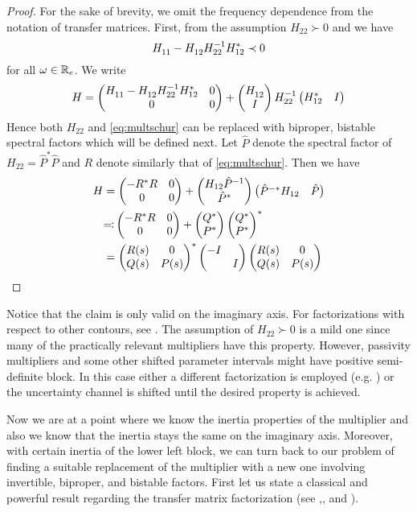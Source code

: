 \begin{proof} For the sake of brevity, we omit the frequency dependence from the notation of transfer matrices. First, 
from the assumption $H_{22}\succ 0$ and  we have 
\begin{equation}
H^{\vphantom{-1}}_{11} -H^{\vphantom{-1}}_{12}H_{22}^{-1}H_{12}^* \prec 0
\label{eq:multschur}
\end{equation}
for all $\omega\in\mathbb{R}_e$. We write
\[
H = \begin{pmatrix}H^{\vphantom{-1}}_{11} -H^{\vphantom{-1}}_{12}H_{22}^{-1}H_{12}^*&0\\ 0&0\end{pmatrix} + 
\begin{pmatrix}H^{\vphantom{-1}}_{12}\\ I\end{pmatrix}H_{22}^{-1}\begin{pmatrix}H_{12}^* &I\end{pmatrix}
\]
Hence both $H_{22}$ and \eqref{eq:multschur} can be replaced with biproper, bistable spectral factors 
which will be defined next. Let $\hat{P}$ denote the spectral factor of $H_{22} = \hat{P}^*\hat{P}$ and $R$ denote similarly
that of \eqref{eq:multschur}. Then we have
\begin{align*}
H &= \pmatr{-R^*R&0\\0&0} + \pmatr{H_{12}\inv{\hat{P}}\\\hat{P}^*}\pmatr{{\hat{P}}^{-*}H_{12}&\hat{P}} \\
&\reflectbox{$\coloneqq$} 
\pmatr{-R^*R&0\\0&0}+\pmatr{Q^*\\P^*}\pmatr{Q^*\\P^*}^*\\
&= \pmatr{R(s)&0\\ Q(s)&P(s)}^* \pmatr{-I&\\ &I}\pmatr{R(s)&0\\ Q(s)&P(s)}
\end{align*}

\end{proof}

Notice that the claim is only valid on the imaginary axis. For factorizations with respect to other contours, see \cite{bart10}. 
The assumption of $H_{22}\succ 0$ is a mild one since many of the practically relevant multipliers have this property. However, 
passivity multipliers and some other shifted parameter intervals might have positive semi-definite block. In 
this case either a different factorization is employed (e.g. \cite{goh962}) or the uncertainty channel is shifted until the desired 
property is achieved.  




Now we are at a point where we know the inertia properties of the multiplier and also we know that the
inertia stays the same on the imaginary axis. Moreover, with certain inertia of the lower left block,
we can turn back to our problem of finding a suitable replacement of the multiplier with a new one involving 
invertible, biproper, and bistable factors. First let us state a classical and powerful result regarding the 
transfer matrix factorization (see \cite[Thm. 13.19]{zhoubook},\cite[Thm. 7.3]{francis}, and \cite[Thm. 2]{youla}).

